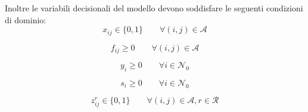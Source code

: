 		Inoltre le variabili decisionali del modello devono soddisfare le seguenti condizioni di dominio:
		\begin{equation}
			\label{eq:assignment_var}
			x_{ij} \in \{0,1\} \qquad \forall (i,j) \in \mathcal{A}
		\end{equation}

		\begin{equation}
			\label{eq:assignment_var}
			f_{ij} \geq 0 \qquad \forall (i,j) \in \mathcal{A}
		\end{equation}

		\begin{equation}
			\label{eq:assignment_var}
			y_i \geq 0 \qquad \forall i \in \mathcal{N}_0
		\end{equation}

		\begin{equation}
			\label{eq:assignment_var}
			s_i \geq 0 \qquad \forall i \in \mathcal{N}_0
		\end{equation}

		\begin{equation}
			\label{eq:assignment_var}
			z_{ij}^r \in \{0,1\} \qquad \forall (i,j) \in \mathcal{A}, r \in \mathcal{R}
		\end{equation}


